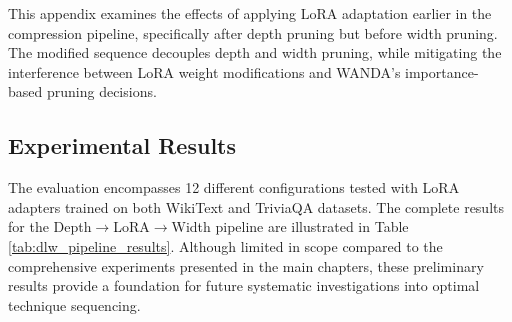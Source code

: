 This appendix examines the effects of applying LoRA adaptation earlier in the compression pipeline, specifically after depth pruning but before width pruning. The modified sequence decouples depth and width pruning, while mitigating the interference between LoRA weight modifications and WANDA's importance-based pruning decisions.

\subsection{Experimental Results}
The evaluation encompasses 12 different configurations tested with LoRA adapters trained on both WikiText and TriviaQA datasets. The complete results for the Depth$\rightarrow$LoRA$\rightarrow$Width pipeline are illustrated in Table \ref{tab:dlw_pipeline_results}. Although limited in scope compared to the comprehensive experiments presented in the main chapters, these preliminary results provide a foundation for future systematic investigations into optimal technique sequencing.

